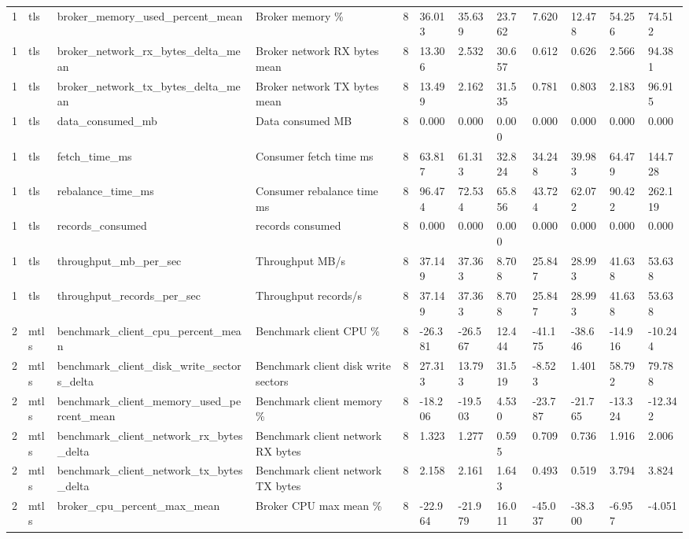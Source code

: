 \begin{longtable}{llllllllllll}
1 & tls & broker\_memory\_used\_percent\_mean & Broker memory \% & 8 & 36.013 & 35.639 & 23.762 & 7.620 & 12.478 & 54.256 & 74.512 \\
1 & tls & broker\_network\_rx\_bytes\_delta\_mean & Broker network RX bytes mean & 8 & 13.306 & 2.532 & 30.657 & 0.612 & 0.626 & 2.566 & 94.381 \\
1 & tls & broker\_network\_tx\_bytes\_delta\_mean & Broker network TX bytes mean & 8 & 13.499 & 2.162 & 31.535 & 0.781 & 0.803 & 2.183 & 96.915 \\
1 & tls & data\_consumed\_mb & Data consumed MB & 8 & 0.000 & 0.000 & 0.000 & 0.000 & 0.000 & 0.000 & 0.000 \\
1 & tls & fetch\_time\_ms & Consumer fetch time ms & 8 & 63.817 & 61.313 & 32.824 & 34.248 & 39.983 & 64.479 & 144.728 \\
1 & tls & rebalance\_time\_ms & Consumer rebalance time ms & 8 & 96.474 & 72.534 & 65.856 & 43.724 & 62.072 & 90.422 & 262.119 \\
1 & tls & records\_consumed & records consumed & 8 & 0.000 & 0.000 & 0.000 & 0.000 & 0.000 & 0.000 & 0.000 \\
1 & tls & throughput\_mb\_per\_sec & Throughput MB/s & 8 & 37.149 & 37.363 & 8.708 & 25.847 & 28.993 & 41.638 & 53.638 \\
1 & tls & throughput\_records\_per\_sec & Throughput records/s & 8 & 37.149 & 37.363 & 8.708 & 25.847 & 28.993 & 41.638 & 53.638 \\
2 & mtls & benchmark\_client\_cpu\_percent\_mean & Benchmark client CPU \% & 8 & -26.381 & -26.567 & 12.444 & -41.175 & -38.646 & -14.916 & -10.244 \\
2 & mtls & benchmark\_client\_disk\_write\_sectors\_delta & Benchmark client disk write sectors & 8 & 27.313 & 13.793 & 31.519 & -8.523 & 1.401 & 58.792 & 79.788 \\
2 & mtls & benchmark\_client\_memory\_used\_percent\_mean & Benchmark client memory \% & 8 & -18.206 & -19.503 & 4.530 & -23.787 & -21.765 & -13.324 & -12.342 \\
2 & mtls & benchmark\_client\_network\_rx\_bytes\_delta & Benchmark client network RX bytes & 8 & 1.323 & 1.277 & 0.595 & 0.709 & 0.736 & 1.916 & 2.006 \\
2 & mtls & benchmark\_client\_network\_tx\_bytes\_delta & Benchmark client network TX bytes & 8 & 2.158 & 2.161 & 1.643 & 0.493 & 0.519 & 3.794 & 3.824 \\
2 & mtls & broker\_cpu\_percent\_max\_mean & Broker CPU max mean \% & 8 & -22.964 & -21.979 & 16.011 & -45.037 & -38.300 & -6.957 & -4.051 \\

\end{longtable}
